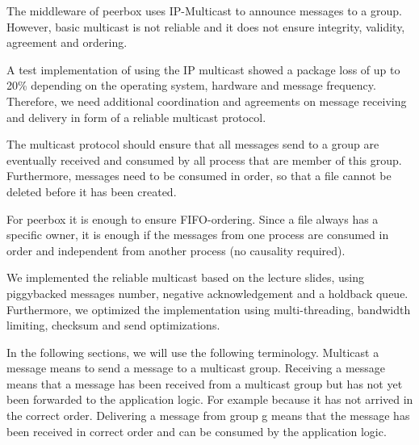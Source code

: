 The middleware of peerbox uses IP-Multicast to announce messages to a group. However, basic multicast is not reliable and it does not ensure integrity, validity, agreement and ordering.

A test implementation of using the IP multicast showed a package loss of up to 20\% depending on the operating system, hardware and message frequency. 
Therefore, we need additional coordination and agreements on message receiving and delivery in form of a reliable multicast protocol.


The multicast protocol should ensure that all messages send to a group are eventually received and consumed by all process that are member of this group. Furthermore, messages need to be consumed in order, so that a file cannot be deleted before it has been created. 

For peerbox it is enough to ensure FIFO-ordering. Since a file always has a specific owner, it is enough if the messages from one process are consumed in order and independent from another process (no causality required). 

We implemented the reliable multicast based on the lecture slides, using  piggybacked messages number, negative acknowledgement and a holdback queue. Furthermore, we optimized the implementation using  multi-threading, bandwidth limiting, checksum and send optimizations. 
    
In the following sections, we will use the following terminology. Multicast a message means to send a message to a multicast group. Receiving a message means that a message has been received from a multicast group but has not yet been forwarded to the application logic. For example because it has not arrived in the correct order. Delivering a message from group g means that the message has been received in correct order and can be consumed by the application logic.


 
% 
% 
% 
% 

